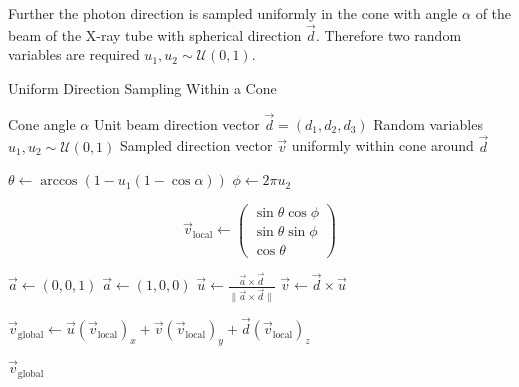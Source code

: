 Further the photon direction is sampled uniformly in the cone with angle
$\alpha$ of the beam of the X-ray tube with spherical direction $\vec{d}$.
Therefore two random variables are required $u_1, u_2 \sim \mathcal{U}(0, 1)$.

\begin{algorithm}[H]
\caption{Uniform Direction Sampling Within a Cone}
\begin{algorithmic}[1]
\Require Cone angle $\alpha$
\Require Unit beam direction vector $\vec{d} = (d_1, d_2, d_3)$
\Require Random variables $u_1, u_2 \sim \mathcal{U}(0,1)$
\Ensure Sampled direction vector $\vec{v}$ uniformly within cone around
$\vec{d}$


\State $\theta \gets \arccos(1 - u_1 (1 - \cos \alpha))$ 
\State $\phi \gets 2\pi u_2$ 


\State $$\vec{v}_{\text{local}} \gets 
\begin{pmatrix}
\sin\theta \cos\phi \\
\sin\theta \sin\phi \\
\cos\theta \end{pmatrix}$$

    \State $\vec{a} \gets (0, 0, 1)$
\Else
    \State $\vec{a} \gets (1, 0, 0)$
\EndIf
\State $\vec{u} \gets \frac{\vec{a} \times \vec{d}}{\|\vec{a} \times \vec{d}\|}$ 
\State $\vec{v} \gets \vec{d} \times \vec{u}$ 

\State $\vec{v}_{\text{global}} \gets \vec{u} (\vec{v}_{\text{local}})_x + \vec{v} (\vec{v}_{\text{local}})_y + \vec{d} (\vec{v}_{\text{local}})_z$

\State \Return $\vec{v}_{\text{global}}$

\end{algorithmic}
\end{algorithm}










